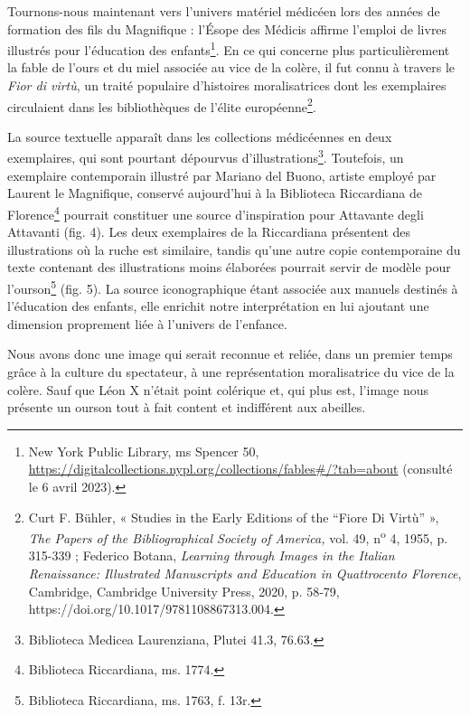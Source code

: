 \documentclass[12pt,twoside,openany]{book}
\begin{document}
Tournons-nous maintenant vers l’univers matériel médicéen lors des années de formation des fils du Magnifique : l’Ésope des Médicis affirme l’emploi de livres illustrés pour l’éducation des enfants\footnote{New York Public Library, ms Spencer 50, \href{https://digitalcollections.nypl.org/collections/fables\#/?tab=about}{https://digitalcollections.nypl.org/collections/fables\#/?tab=about} (consulté le 6 avril 2023).}. En ce qui concerne plus particulièrement la fable de l’ours et du miel associée au vice de la colère, il fut connu à travers le \textit{Fior di virtù}, un traité populaire d’histoires moralisatrices dont les exemplaires circulaient dans les bibliothèques de l’élite européenne\footnote{Curt F. Bühler, « Studies in the Early Editions of the “Fiore Di Virtù” », \textit{The Papers of the Bibliographical Society of America, }vol. 49, n\textsuperscript{o} 4, 1955, p. 315-339 ; Federico Botana, \textit{Learning through Images in the Italian Renaissance: Illustrated Manuscripts and Education in Quattrocento Florence}, Cambridge, Cambridge University Press, 2020, p. 58‑79, https://doi.org/10.1017/9781108867313.004.}.

La source textuelle apparaît dans les collections médicéennes en deux exemplaires, qui sont pourtant dépourvus d’illustrations\footnote{Biblioteca Medicea Laurenziana, Plutei 41.3, 76.63.}. Toutefois, un exemplaire contemporain illustré par Mariano del Buono, artiste employé par Laurent le Magnifique, conservé aujourd’hui à la Biblioteca Riccardiana de Florence\footnote{Biblioteca Riccardiana, ms. 1774.} pourrait constituer une source d’inspiration pour Attavante degli Attavanti (fig. 4). Les deux exemplaires de la Riccardiana présentent des illustrations où la ruche est similaire, tandis qu’une autre copie contemporaine du texte contenant des illustrations moins élaborées pourrait servir de modèle pour l’ourson\footnote{Biblioteca Riccardiana, ms. 1763, f. 13r.} (fig. 5). La source iconographique étant associée aux manuels destinés à l’éducation des enfants, elle enrichit notre interprétation en lui ajoutant une dimension proprement liée à l’univers de l’enfance.

Nous avons donc une image qui serait reconnue et reliée, dans un premier temps grâce à la culture du spectateur, à une représentation moralisatrice du vice de la colère. Sauf que Léon X n’était point colérique et, qui plus est, l’image nous présente un ourson tout à fait content et indifférent aux abeilles.
\end{document}

